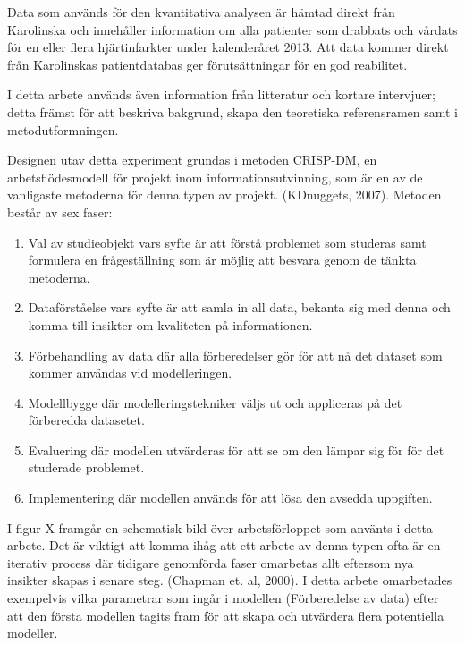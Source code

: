 Data som används för den kvantitativa analysen är hämtad direkt från Karolinska och innehåller information om alla patienter som drabbats och vårdats för en eller flera hjärtinfarkter under kalenderåret 2013. Att data kommer direkt från Karolinskas patientdatabas ger förutsättningar för en god reabilitet.

I detta arbete används även information från litteratur och kortare intervjuer; detta främst för att beskriva bakgrund, skapa den teoretiska referensramen samt i metodutformningen.

Designen utav detta experiment grundas i metoden CRISP-DM, en arbetsflödesmodell för projekt inom informationsutvinning, som är en av de vanligaste metoderna för denna typen av projekt. (KDnuggets, 2007). Metoden består av sex faser:

\begin{enumerate}
  \item Val av studieobjekt vars syfte är att förstå problemet som studeras samt formulera en frågeställning som är möjlig att besvara genom de tänkta metoderna.
  \item Dataförståelse vars syfte är att samla in all data, bekanta sig med denna och komma till insikter om kvaliteten på informationen.
  \item Förbehandling av data där alla förberedelser gör för att nå det dataset som kommer användas vid modelleringen.
  \item Modellbygge där modelleringstekniker väljs ut och appliceras på det förberedda datasetet.
  \item Evaluering där modellen utvärderas för att se om den lämpar sig för för det studerade problemet.
  \item Implementering där modellen används för att lösa den avsedda uppgiften.
\end{enumerate}

I figur X framgår en schematisk bild över arbetsförloppet som använts i detta arbete. Det är viktigt att komma ihåg att ett arbete av denna typen ofta är en iterativ process där tidigare genomförda faser omarbetas allt eftersom nya insikter skapas i senare steg. (Chapman et. al, 2000). I detta arbete omarbetades exempelvis vilka parametrar som ingår i modellen (Förberedelse av data) efter att den första modellen tagits fram för att skapa och utvärdera flera potentiella modeller.

